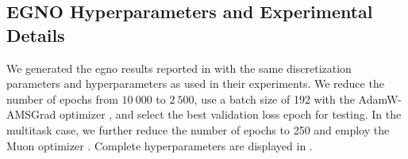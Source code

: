 \subsection{EGNO Hyperparameters and Experimental Details}
\label{appx:egno_hyperparams}
We generated the \gls{egno} results reported in  with the same discretization parameters and hyperparameters as used in their experiments. We reduce the number of epochs from \(10\ 000\) to \(2\ 500\), use a batch size of 192 with the AdamW-AMSGrad optimizer \cite{loshchilov_decoupled_2017}, and select the best validation loss epoch for testing. In the multitask case, we further reduce the number of epochs to 250 and employ the Muon optimizer \cite{jordan_muon_2024, kim_pytorch_optimizer_2021}. Complete hyperparameters are displayed in .

